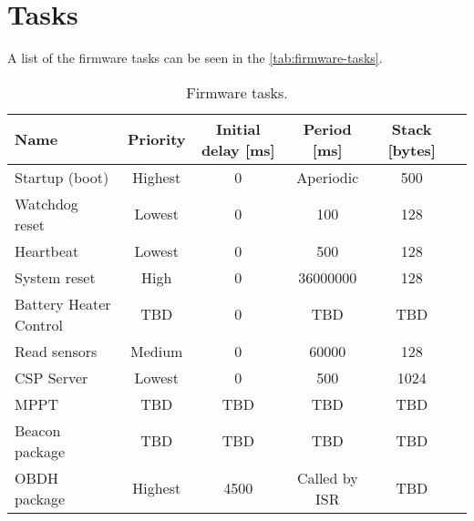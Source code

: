 \section{Tasks}

A list of the firmware tasks can be seen in the \autoref{tab:firmware-tasks}.

\begin{table}[!h]
    \centering
    \begin{tabular}{lccccc}
        \toprule[1.5pt]
        \textbf{Name}          & \textbf{Priority} & \textbf{Initial delay [ms]} & \textbf{Period [ms]} & \textbf{Stack [bytes]} \\
        \midrule
        Startup (boot)         & Highest           & 0                           & Aperiodic            & 500                    \\
        Watchdog reset         & Lowest            & 0                           & 100                  & 128                    \\
        Heartbeat              & Lowest            & 0                           & 500                  & 128                    \\
        System reset           & High              & 0                           & 36000000             & 128                    \\
        Battery Heater Control & TBD               & 0                           & TBD                  & TBD                    \\
        Read sensors           & Medium            & 0                           & 60000                & 128                    \\
        CSP Server             & Lowest            & 0                           & 500                  & 1024                   \\
        MPPT                   & TBD               & TBD                         & TBD                  & TBD                    \\
        Beacon package         & TBD               & TBD                         & TBD                  & TBD                    \\
        OBDH package           & Highest           & 4500   & Called by ISR\nomenclature{\textbf{ISR}}{\textit{Interrupt Service Routine.}}   & TBD \\
        \bottomrule[1.5pt]
    \end{tabular}
    \caption{Firmware tasks.}
    \label{tab:firmware-tasks}
\end{table}
